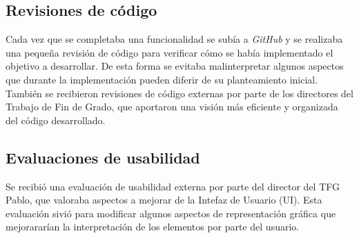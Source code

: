 \subsection{Revisiones de código}

Cada vez que se completaba una funcionalidad se subía a \textit{GitHub} y se realizaba una pequeña revisión de código para verificar cómo se había implementado el objetivo a desarrollar. De esta forma se evitaba malinterpretar algunos aspectos que durante la implementación pueden diferir de su planteamiento inicial. También se recibieron revisiones de código externas por parte de los directores del Trabajo de Fin de Grado, que aportaron una visión más eficiente y organizada del código desarrollado.

\subsection{Evaluaciones de usabilidad}

Se recibió una evaluación de usabilidad externa por parte del director del TFG Pablo, que valoraba aspectos a mejorar de la Intefaz de Usuario (UI). Esta evaluación sivió para modificar algunos aspectos de representación gráfica que mejorararían la interpretación de los elementos por parte del usuario.

